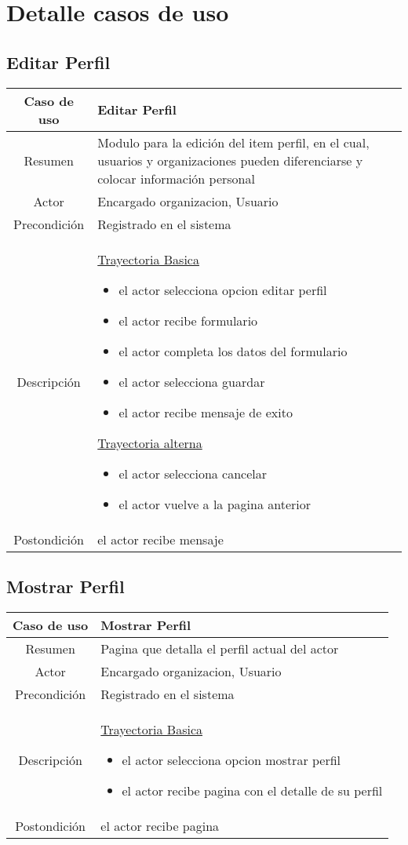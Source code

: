 \documentclass[letterpaper,openright,10pt,oneside]{report}
\begin{document}
\section{Detalle casos de uso}
\subsection{Editar Perfil}

\begin{tabular}{|c|p{110mm}|}
\hline
	Caso de uso & Editar Perfil\\
\hline
	Resumen & Modulo para la edición del item perfil, en el cual,
	usuarios y organizaciones pueden diferenciarse y colocar información personal\\
\hline
	Actor & Encargado organizacion, Usuario\\
\hline
	Precondición & Registrado en el sistema\\
\hline
	Descripción & 
	\underline{Trayectoria Basica}
	\begin{itemize}
		\item el actor selecciona opcion editar perfil
		\item el actor recibe formulario
		\item el actor completa los datos del formulario
		\item el actor selecciona guardar
		\item el actor recibe mensaje de exito
	\end{itemize}
	\underline{Trayectoria alterna}
	\begin{itemize}
		\item el actor selecciona cancelar
		\item el actor vuelve a la pagina anterior
	\end{itemize}\\
\hline
	Postondición & el actor recibe mensaje\\
\hline
\end{tabular}

\subsection{Mostrar Perfil}

\begin{tabular}{|c|p{110mm}|}
\hline
	Caso de uso & Mostrar Perfil\\
\hline
	Resumen & Pagina que detalla el perfil actual del actor\\
\hline
	Actor & Encargado organizacion, Usuario\\
\hline
	Precondición & Registrado en el sistema\\
\hline
	Descripción & 
	\underline{Trayectoria Basica}
	\begin{itemize}
		\item el actor selecciona opcion mostrar perfil
		\item el actor recibe pagina con el detalle de su perfil
	\end{itemize}
	\\
\hline
	Postondición & el actor recibe pagina\\
\hline
\end{tabular}
\end{document}
